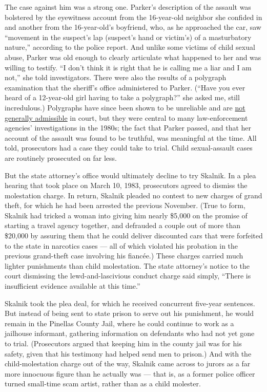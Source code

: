 The case against him was a strong one. Parker's description of the
assault was bolstered by the eyewitness account from the 16-year-old
neighbor she confided in and another from the 16-year-old's boyfriend,
who, as he approached the car, saw ``movement in the suspect's lap
(suspect's hand or victim's) of a masturbatory nature,'' according to
the police report. And unlike some victims of child sexual abuse, Parker
was old enough to clearly articulate what happened to her and was
willing to testify. ``I don't think it is right that he is calling me a
liar and I am not,'' she told investigators. There were also the results
of a polygraph examination that the sheriff's office administered to
Parker. (``Have you ever heard of a 12-year-old girl having to take a
polygraph?'' she asked me, still incredulous.) Polygraphs have since
been shown to be unreliable and are
\href{https://www.justice.gov/jm/criminal-resource-manual-262-polygraphs-introduction-trial}{not
generally admissible} in court, but they were central to many
law-enforcement agencies' investigations in the 1980s; the fact that
Parker passed, and that her account of the assault was found to be
truthful, was meaningful at the time. All told, prosecutors had a case
they could take to trial. Child sexual-assault cases are routinely
prosecuted on far less.

But the state attorney's office would ultimately decline to try Skalnik.
In a plea hearing that took place on March 10, 1983, prosecutors agreed
to dismiss the molestation charge. In return, Skalnik pleaded no contest
to new charges of grand theft, for which he had been arrested the
previous November. (True to form, Skalnik had tricked a woman into
giving him nearly \$5,000 on the promise of starting a travel agency
together, and defrauded a couple out of more than \$20,000 by assuring
them that he could deliver discounted cars that were forfeited to the
state in narcotics cases --- all of which violated his probation in the
previous grand-theft case involving his fiancée.) These charges carried
much lighter punishments than child molestation. The state attorney's
notice to the court dismissing the lewd-and-lascivious conduct charge
said simply, ``There is insufficient evidence available at this time.''

Skalnik took the plea deal, for which he received concurrent five-year
sentences. But instead of being sent to state prison to serve out his
punishment, he would remain in the Pinellas County Jail, where he could
continue to work as a jailhouse informant, gathering information on
defendants who had not yet gone to trial. (Prosecutors argued that
keeping him in the county jail was for his safety, given that his
testimony had helped send men to prison.) And with the child-molestation
charge out of the way, Skalnik came across to jurors as a far more
innocuous figure than he actually was --- that is, as a former police
officer turned small-time scam artist, rather than as a child molester.

